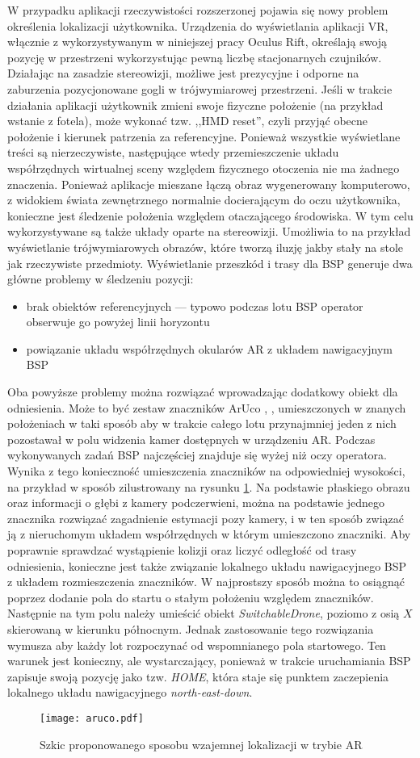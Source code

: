 W przypadku aplikacji rzeczywistości rozszerzonej pojawia się nowy problem określenia lokalizacji użytkownika. Urządzenia do wyświetlania aplikacji VR, włącznie z wykorzystywanym w niniejszej pracy Oculus Rift, określają swoją pozycję w przestrzeni wykorzystując pewną liczbę stacjonarnych czujników. Działając na zasadzie stereowizji, możliwe jest prezycyjne i odporne na zaburzenia pozycjonowane gogli w trójwymiarowej przestrzeni. Jeśli w trakcie działania aplikacji użytkownik zmieni swoje fizyczne położenie (na przykład wstanie z fotela), może wykonać tzw. ,,HMD reset'', czyli przyjąć obecne położenie i kierunek patrzenia za referencyjne. Ponieważ wszystkie wyświetlane treści są nierzeczywiste, następujące wtedy przemieszczenie układu współrzędnych wirtualnej sceny względem fizycznego otoczenia nie ma żadnego znaczenia. Ponieważ aplikacje mieszane łączą obraz wygenerowany komputerowo, z widokiem świata zewnętrznego normalnie docierającym do oczu użytkownika, konieczne jest śledzenie położenia względem otaczającego środowiska. W tym celu wykorzystywane są także układy oparte na stereowizji. Umożliwia to na przykład wyświetlanie trójwymiarowych obrazów, które tworzą iluzję jakby stały na stole jak rzeczywiste przedmioty. Wyświetlanie przeszkód i trasy dla BSP generuje dwa główne problemy w śledzeniu pozycji:
\begin{itemize}
    \item brak obiektów referencyjnych --- typowo podczas lotu BSP operator obserwuje go powyżej linii horyzontu
    \item powiązanie układu współrzędnych okularów AR z układem nawigacyjnym BSP
\end{itemize}

Oba powyższe problemy można rozwiązać wprowadzając dodatkowy obiekt dla odniesienia. Może to być zestaw znaczników ArUco \cite{aruco2016}, \cite{aruco2018}, umieszczonych w znanych położeniach w taki sposób aby w trakcie całego lotu przynajmniej jeden z nich pozostawał w polu widzenia kamer dostępnych w urządzeniu AR. Podczas wykonywanych zadań BSP najczęściej znajduje się wyżej niż oczy operatora. Wynika z tego konieczność umieszczenia znaczników na odpowiedniej wysokości, na przykład w sposób zilustrowany na rysunku \ref{fig:aruco}. Na podstawie płaskiego obrazu oraz informacji o głębi z kamery podczerwieni, można na podstawie jednego znacznika rozwiązać zagadnienie estymacji pozy kamery, i w ten sposób związać ją z nieruchomym układem współrzędnych w którym umieszczono znaczniki. Aby poprawnie sprawdzać wystąpienie kolizji oraz liczyć odległość od trasy odniesienia, konieczne jest także związanie lokalnego układu nawigacyjnego BSP z układem rozmieszczenia znaczników. W najprostszy sposób można to osiągnąć poprzez dodanie pola do startu o stałym położeniu względem znaczników. Następnie na tym polu należy umieścić obiekt \emph{SwitchableDrone}, poziomo z osią $ X $ skierowaną w kierunku północnym. Jednak zastosowanie tego rozwiązania wymusza aby każdy lot rozpoczynać od wspomnianego pola startowego. Ten warunek jest konieczny, ale wystarczający, ponieważ w trakcie uruchamiania BSP zapisuje swoją pozycję jako tzw. \emph{HOME}, która staje się punktem zaczepienia lokalnego układu nawigacyjnego \emph{north-east-down}.

\begin{figure}[!h]
    \centering \texttt{[image: aruco.pdf]}
    \caption{Szkic proponowanego sposobu wzajemnej lokalizacji w trybie AR}
    \label{fig:aruco}
\end{figure}
